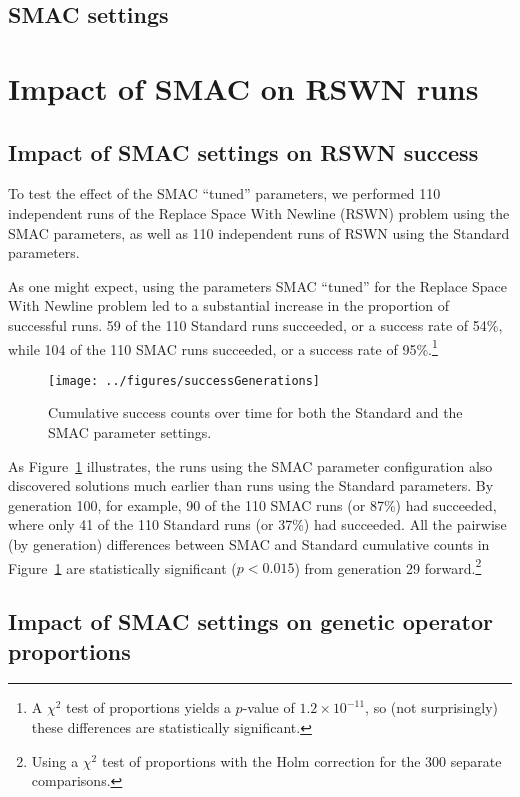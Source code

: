 \subsection{SMAC settings}
\label{sec:SMACsettings}

\section{Impact of SMAC on RSWN runs}
\label{sec:SMACimpact}

\subsection{Impact of SMAC settings on RSWN success}
\label{sec:SMACsuccessRSWN}

To test the effect of the SMAC ``tuned'' parameters, we performed 110
independent runs of the Replace Space With Newline (RSWN) problem using the
SMAC parameters, as well as 110 independent runs of RSWN using the
Standard parameters.

As one might expect, using the parameters SMAC ``tuned'' for the
Replace Space With Newline problem led to a 
substantial increase in the proportion of successful runs. 59 of 
the 110 Standard runs succeeded, or a success rate of 54\%, while 104 of the
110 SMAC runs succeeded, or a success rate of 95\%.\footnote{A $\chi^2$ test of 
proportions yields a $p$-value of $1.2 \times 10^{-11}$, so (not surprisingly)
these differences are statistically significant.}

\begin{figure}
	\texttt{[image: ../figures/successGenerations]}
	\caption{Cumulative success counts over time for both the Standard
	and the SMAC parameter settings.}
	\label{fig:successGenerations}
\end{figure}

As Figure~\ref{fig:successGenerations} illustrates, the runs using the SMAC
parameter configuration also discovered solutions much earlier than runs using
the Standard parameters. By generation 100, for example, 90 of the 110 SMAC 
runs (or 87\%) had succeeded, where only 41 of the 110 Standard runs 
(or 37\%) had succeeded. All the pairwise (by generation) differences 
between SMAC and Standard cumulative counts in 
Figure~\ref{fig:successGenerations} are 
statistically significant ($p<0.015$)
from generation 29 forward.\footnote{Using a $\chi^2$ test of proportions 
	with the Holm correction for the 300 separate comparisons.}

\subsection{Impact of SMAC settings on genetic operator proportions}
\label{sec:SMACimpactRSWNops}

